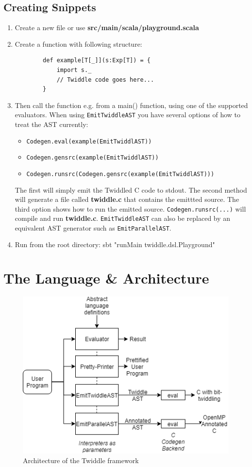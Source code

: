 \documentclass{article}
\begin{document}
\subsection{Creating Snippets}
\begin{enumerate}
	\item Create a new file or use \textbf{src/main/scala/playground.scala}
	\item Create a function with following structure:
	\begin{verbatim}
		def example[T[_]](s:Exp[T]) = {
		    import s._
		    // Twiddle code goes here...
		}
	\end{verbatim}
	\item Then call the function e.g. from a main() function, using one of the supported evaluators. When using \texttt{EmitTwiddleAST} you have several options of how to treat the AST currently:
	\begin{itemize}
		\item \texttt{Codegen.eval(example(EmitTwiddlAST))}
		\item \texttt{Codegen.gensrc(example(EmitTwiddlAST))}
		\item \texttt{Codegen.runsrc(Codegen.gensrc(example(EmitTwiddlAST)))}
	\end{itemize}
	The first will simply emit the Twiddled C code to stdout. The second method will generate a file called	\textbf{twiddle.c} that contains the emittted source. The third option shows how to run the emitted source. \texttt{Codegen.runsrc(...)} will compile and run \textbf{twiddle.c}.
	\texttt{EmitTwiddleAST} can also be replaced by an equivalent AST generator such as \texttt{EmitParallelAST}.

	\item Run from the root directory: sbt "runMain twiddle.dsl.Playground"
\end{enumerate}

\section{The Language \& Architecture}
\begin{figure}[t]
	\centering
	\includegraphics[scale=0.8]{twiddle_arch.png}
	\caption{Architecture of the Twiddle framework}\label{twiddle_arch}
\end{figure}
\end{document}

